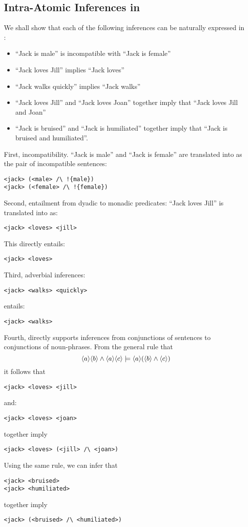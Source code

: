 \subsection{Intra-Atomic Inferences in \ELFULL{}}
We shall show that each of the following inferences can be naturally expressed in \ELABR{}:
\begin{itemize}
\item
``Jack is male'' is incompatible with ``Jack is female''
\item
``Jack loves Jill'' implies ``Jack loves''
\item
``Jack walks quickly'' implies ``Jack walks''
\item
``Jack loves Jill'' and ``Jack loves Joan'' together imply that ``Jack loves Jill and Joan''
\item
``Jack is bruised'' and ``Jack is humiliated'' together imply that ``Jack is bruised and humiliated''.
\end{itemize}
First, incompatibility. ``Jack is male'' and ``Jack is female'' are translated into \ELABR{} as the pair of incompatible sentences:
\begin{verbatim}
<jack> (<male> /\ !{male})
<jack> (<female> /\ !{female})
\end{verbatim}

Second, entailment from dyadic to monadic predicates:
``Jack loves Jill'' is translated into \ELABR{} as:
\begin{verbatim}
<jack> <loves> <jill>
\end{verbatim}
This directly entails:
\begin{verbatim}
<jack> <loves>
\end{verbatim}
Third, adverbial inferences: 
\begin{verbatim}
<jack> <walks> <quickly>
\end{verbatim}
entails:
\begin{verbatim}
<jack> <walks>
\end{verbatim}
Fourth, \ELABR{} directly supports inferences from conjunctions of sentences to conjunctions of noun-phrases.
From the general rule that
\[
\langle a \rangle \langle b \rangle \land \langle a \rangle \langle c \rangle \models \langle a \rangle (\langle b \rangle \land \langle c \rangle )
\]
it follows that 
\begin{verbatim}
<jack> <loves> <jill>
\end{verbatim}
and:
\begin{verbatim}
<jack> <loves> <joan>
\end{verbatim}
together imply
\begin{verbatim}
<jack> <loves> (<jill> /\ <joan>)
\end{verbatim}
Using the same rule, we can infer that
\begin{verbatim}
<jack> <bruised>
<jack> <humiliated>
\end{verbatim}
together imply
\begin{verbatim}
<jack> (<bruised> /\ <humiliated>)
\end{verbatim}
 
